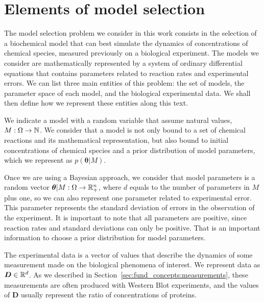 \section{Elements of model selection}
The model selection problem we consider in this work consists in the
selection of a biochemical model that can best simulate the dynamics 
of concentrations of chemical species, measured previously on a 
biological experiment. The models we consider are mathematically 
represented by a system of ordinary differential equations that
contains parameters related to reaction rates and experimental errors.
We can list three main entities of this problem: the set of models, the 
parameter space of each model, and the biological experimental data.
We shall then define how we represent these entities along this text.

We indicate a model with a random variable that assume natural values, 
$M: \Omega \to \mathbb{N}$. We consider that a model is not only bound to
a set of chemical reactions and its mathematical representation, but 
also bound to initial concentrations of chemical species and a
prior distribution of model parameters, which we represent as $p({\bm
\theta} | M)$.

Once we are using a Bayesian approach, we consider that model
parameters is a random vector ${\bm\theta} | M: \Omega \to \mathbb{R}^{n}_+$,
where $d$ equals to the number of parameters in $M$ plus one, so we can
also represent one parameter related to experimental error. This
parameter represents the standard deviation of errors in the observation
of the experiment. It is important to note that all parameters are
positive, since reaction rates and standard deviations can only be
positive. That is an important information to choose a prior
distribution for model parameters.

The experimental data is a vector of values that describe the dynamics
of some measurement made on the biological phenomena of interest. We
represent data as ${\bm D} \in \mathbb{R}^{d}$. As we described in
Section~\ref{sec:fund_concepts:measurements}, these measurements are
often produced with Western Blot experiments, and the values of ${\bm D}$
usually represent the ratio of concentrations of proteins.


